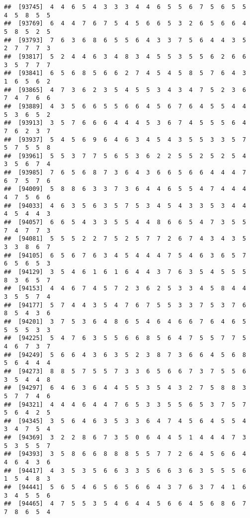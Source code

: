 \documentclass[
]{book}
\begin{document}
\begin{verbatim}
##  [93745]  4  4  6  5  4  3  3  3  4  4  6  5  5  6  7  5  6  5  5  4  5  8  5  5
##  [93769]  6  4  4  7  6  7  5  4  5  6  6  5  3  2  6  5  6  6  4  5  8  5  2  5
##  [93793]  7  6  3  6  8  6  5  5  6  4  3  3  7  5  6  4  4  3  5  2  7  7  7  3
##  [93817]  5  2  4  4  6  3  4  8  3  4  5  5  3  5  5  6  2  6  6  3  5  7  7  7
##  [93841]  6  5  6  8  5  6  6  2  7  4  5  4  5  8  5  7  6  4  3  1  6  5  6  2
##  [93865]  4  7  3  6  2  3  5  4  5  5  3  4  3  4  7  5  2  3  6  7  4  7  6  6
##  [93889]  4  3  5  6  6  5  5  6  6  4  5  6  7  6  4  5  5  4  4  5  3  6  5  2
##  [93913]  3  5  7  6  6  6  4  4  4  5  3  6  7  4  5  5  5  6  4  7  6  2  3  7
##  [93937]  5  4  5  6  9  6  4  6  3  4  5  4  3  5  5  3  3  5  7  5  7  5  5  8
##  [93961]  5  5  3  7  7  5  6  5  3  6  2  2  5  5  2  5  2  5  4  3  5  6  7  4
##  [93985]  7  6  5  6  8  7  3  6  4  3  6  6  5  6  6  4  4  4  7  6  7  5  7  6
##  [94009]  5  8  8  6  3  3  7  3  6  4  4  6  5  5  4  7  4  4  4  4  7  5  6  6
##  [94033]  4  6  3  5  6  3  5  7  5  3  4  5  4  3  3  5  3  4  4  4  5  4  4  3
##  [94057]  6  6  5  4  3  3  5  5  4  4  8  6  6  5  4  7  3  5  5  7  4  7  7  3
##  [94081]  5  5  5  2  2  7  5  2  5  7  7  2  6  7  4  3  4  3  5  3  3  8  6  7
##  [94105]  6  5  6  7  6  3  4  5  4  4  4  7  5  4  6  3  6  5  7  6  5  6  5  3
##  [94129]  3  5  4  6  1  6  1  6  4  4  3  7  6  3  5  4  5  5  5  8  3  6  5  7
##  [94153]  4  4  6  7  4  5  7  2  3  6  2  5  3  3  4  5  8  4  4  3  5  5  7  4
##  [94177]  5  7  4  4  3  5  4  7  6  7  5  5  3  3  7  5  3  7  6  8  5  4  3  6
##  [94201]  3  7  5  3  6  4  8  6  5  4  6  4  6  6  7  6  4  6  5  5  5  5  3  3
##  [94225]  5  4  7  6  3  5  5  6  6  8  5  6  4  7  5  5  7  7  5  4  6  7  3  7
##  [94249]  5  6  6  4  3  6  3  5  2  3  8  7  3  6  6  4  5  6  8  5  6  4  4  4
##  [94273]  8  8  5  7  5  5  7  3  3  6  5  6  6  7  3  7  5  5  6  3  5  4  4  8
##  [94297]  6  4  6  3  6  4  4  5  5  3  5  4  3  2  7  5  8  8  3  5  7  7  4  6
##  [94321]  4  4  4  6  4  4  7  6  5  3  3  5  5  6  5  3  7  5  7  5  6  4  2  5
##  [94345]  3  5  6  4  6  3  5  3  3  6  4  7  4  5  6  4  5  5  4  3  4  7  5  4
##  [94369]  3  2  2  8  6  7  3  5  0  6  4  4  5  1  4  4  4  7  3  5  3  5  5  7
##  [94393]  3  5  8  6  6  8  8  8  5  5  7  7  2  6  4  5  6  6  4  4  6  4  3  6
##  [94417]  4  3  5  3  5  6  6  3  3  5  6  6  3  6  3  5  5  5  6  1  5  4  8  3
##  [94441]  5  6  5  4  6  5  6  5  6  6  4  3  7  6  3  7  4  1  6  3  4  5  5  6
##  [94465]  4  7  5  5  3  5  4  6  4  4  5  6  6  4  5  6  8  6  7  7  8  6  5  4

\end{verbatim}
\end{document}
